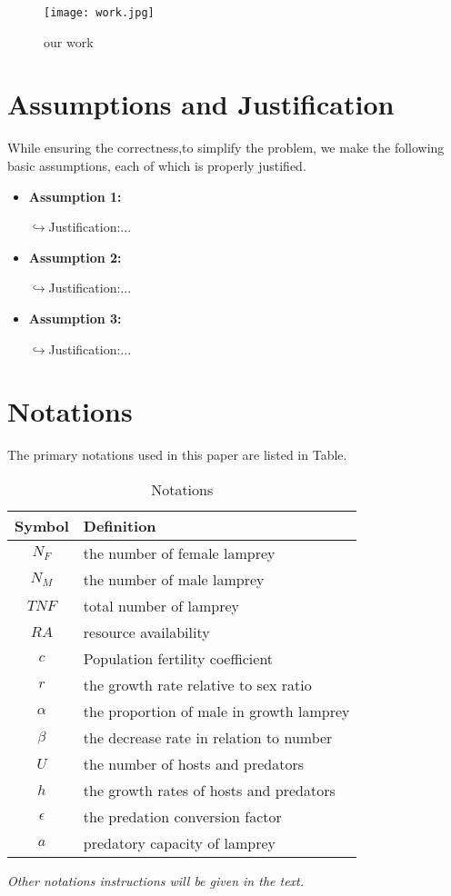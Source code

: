 \documentclass[12pt]{article}  %
\begin{document}
\begin{figure}[htbp]
	\centering
	\texttt{[image: work.jpg]}
	\caption{our work}\label{fig:work}
\end{figure}


\section{Assumptions and Justification}
 While ensuring the correctness,to simplify the problem, we make the following basic assumptions, each of which is properly justified.

\begin{itemize}
	\item \textbf{Assumption 1:}
	
	$\hookrightarrow$Justification:...\cite{1}
	\item \textbf{Assumption 2:}
	
	$\hookrightarrow$Justification:...\cite{2}
	\item \textbf{Assumption 3:}
	
	$\hookrightarrow$Justification:...\cite{3}
\end{itemize}


\section{Notations}
The primary notations used in this paper are listed in Table.

\begin{table}[!htbp]
\begin{center}
\begin{threeparttable}
\caption{Notations}
\begin{tabular}{cl}
	\toprule
	\multicolumn{1}{m{3cm}}{\centering Symbol}
	&\multicolumn{1}{m{12cm}}{\centering Definition}\\
	\midrule
	$N_{F}$&the number of female lamprey\\
	$N_{M}$&the number of male lamprey\\
	$TNF$ &total number of lamprey\\
	$RA$&resource availability\\
	$c$&Population fertility coefficient\\
	$r$ &the growth rate relative to sex ratio\\
	$\alpha$ &the proportion of male in growth lamprey\\
	$\beta$ &the decrease rate in relation to number\\
	$U$&the number of hosts and predators\\
	$h$&the growth rates of hosts and predators\\
	$\epsilon$&the predation conversion factor\\
	$a$&predatory capacity of lamprey\\
	\bottomrule
\end{tabular}\label{tb:001}
\small
\textit{Other notations instructions will be given in the text.}
\end{threeparttable}
\end{center}
\end{table}
\end{document}
